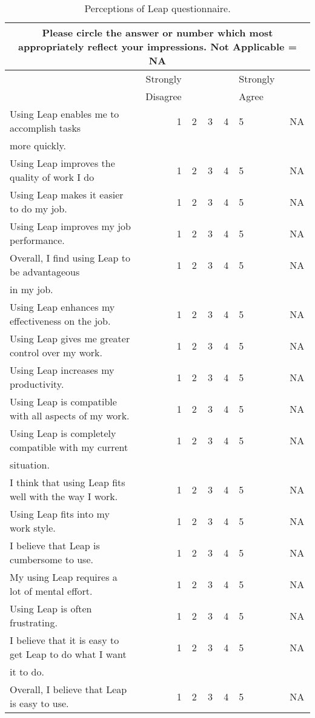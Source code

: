 \documentclass[11pt,times,dissertation,proposal]{uhthesis2e}
\begin{document}
\begin{table}[htbp]
  \caption{Perceptions of Leap questionnaire.}  
  \begin{tabular}{lrccclc}\\
    \multicolumn{7}{c}{Please circle the answer or number which most
    appropriately reflect your impressions. Not Applicable = NA} \\
    \hline
    \hline
    &Strongly&&&&Strongly&\\ 
    &Disagree&&&&Agree&\\ \hline
    Using Leap enables me to accomplish tasks&1&2&3&4&5&NA\\
    more quickly.\\ \hline
    Using Leap improves the quality of work I do&1&2&3&4&5&NA\\ \hline
    Using Leap makes it easier to do my job.&1&2&3&4&5&NA\\ \hline
    Using Leap improves my job performance.&1&2&3&4&5&NA\\ \hline
    Overall, I find using Leap to be advantageous&1&2&3&4&5&NA\\
    in my job.\\ \hline
    Using Leap enhances my effectiveness on the job.&1&2&3&4&5&NA\\ \hline
    Using Leap gives me greater control over my work.&1&2&3&4&5&NA\\ \hline
    Using Leap increases my productivity.&1&2&3&4&5&NA\\ \hline \hline
    Using Leap is compatible with all aspects of my work.&1&2&3&4&5&NA\\ \hline
    Using Leap is completely compatible with my current &1&2&3&4&5&NA\\
    situation.\\ \hline
    I think that using Leap fits well with the way I work.&1&2&3&4&5&NA\\
    \hline
    Using Leap fits into my work style.&1&2&3&4&5&NA\\ \hline \hline
    I believe that Leap is cumbersome to use.&1&2&3&4&5&NA\\ \hline
    My using Leap requires a lot of mental effort.&1&2&3&4&5&NA\\ \hline
    Using Leap is often frustrating.&1&2&3&4&5&NA\\ \hline
    I believe that it is easy to get Leap to do what I want&1&2&3&4&5&NA\\
    it to do. \\ \hline
    Overall, I believe that Leap is easy to use.&1&2&3&4&5&NA\\ \hline

\end{tabular}
\end{table}
\end{document}
